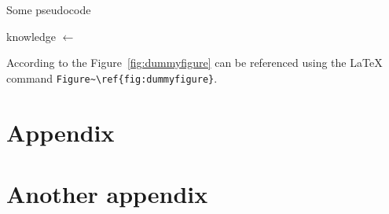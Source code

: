 \documentclass{tut-thesis}
\begin{document}
\begin{algorithm}
	\caption{Some pseudocode}
	\begin{algorithmic}[1]
		 
			\State knowledge $\gets$ 

				\State {}
			\EndWhile
			\State{}
		\EndProcedure
	\end{algorithmic}
\end{algorithm}

\blindtext %

According to \textcite{Doe2015} the Figure~\ref{fig:dummyfigure} can be referenced using the \LaTeX{} command \verb|Figure~\ref{fig:dummyfigure}|.
\blindmathpaper %

\printbibliography

\begin{appendices}
\chapter{Appendix}
\blindtext %
\chapter{Another appendix}
\blindtext
\end{appendices}
\end{document}
